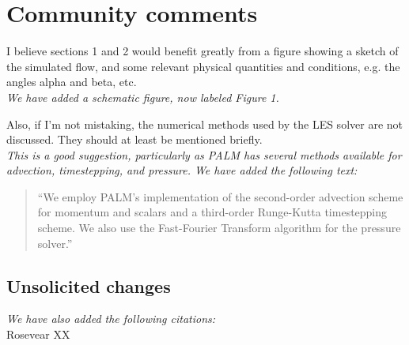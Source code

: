 \documentclass[tc, manuscript]{copernicus}
\begin{document}
\section{Community comments}
I believe sections 1 and 2 would benefit greatly from a figure showing a sketch of the simulated flow, and some relevant physical quantities and conditions, e.g. the angles alpha and beta, etc.\\
\textit{We have added a schematic figure, now labeled Figure 1.}\vspace{12pt}

Also, if I'm not mistaking, the numerical methods used by the LES solver are not discussed. They should at least be mentioned briefly.\\
\textit{This is a good suggestion, particularly as PALM has several methods available for advection, timestepping, and pressure. We have added the following text:}
\begin{quote}
``We employ PALM's implementation of the \citet{piacsek_conservation_1970} second-order advection scheme for momentum and scalars and a third-order Runge-Kutta timestepping scheme. We also use the \citet{temperton_generalized_1992} Fast-Fourier Transform algorithm for the pressure solver.''
\end{quote}\vspace{12pt}

\subsection{Unsolicited changes}

\textit{We have also added the following citations:}\\
Rosevear XX
\end{document}

